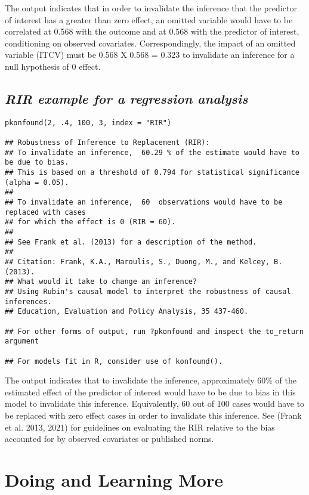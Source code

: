 \documentclass[
]{article}
\begin{document}
The output indicates that in order to invalidate the inference that the
predictor of interest has a greater than zero effect, an omitted
variable would have to be correlated at 0.568 with the outcome and at
0.568 with the predictor of interest, conditioning on observed
covariates. Correspondingly, the impact of an omitted variable (ITCV)
must be 0.568 X 0.568 = 0.323 to invalidate an inference for a null
hypothesis of 0 effect.

\hypertarget{rir-example-for-a-regression-analysis}{%
\subsection{\texorpdfstring{\emph{RIR example for a regression
analysis}}{RIR example for a regression analysis}}\label{rir-example-for-a-regression-analysis}}

\begin{verbatim}
pkonfound(2, .4, 100, 3, index = "RIR")

## Robustness of Inference to Replacement (RIR):
## To invalidate an inference,  60.29 % of the estimate would have to be due to bias. 
## This is based on a threshold of 0.794 for statistical significance (alpha = 0.05).
## 
## To invalidate an inference,  60  observations would have to be replaced with cases
## for which the effect is 0 (RIR = 60).
## 
## See Frank et al. (2013) for a description of the method.
## 
## Citation: Frank, K.A., Maroulis, S., Duong, M., and Kelcey, B. (2013).
## What would it take to change an inference?
## Using Rubin's causal model to interpret the robustness of causal inferences.
## Education, Evaluation and Policy Analysis, 35 437-460.

## For other forms of output, run ?pkonfound and inspect the to_return argument

## For models fit in R, consider use of konfound().
\end{verbatim}

The output indicates that to invalidate the inference, approximately
60\% of the estimated effect of the predictor of interest would have to
be due to bias in this model to invalidate this inference. Equivalently,
60 out of 100 cases would have to be replaced with zero effect cases in
order to invalidate this inference. See (Frank et al. 2013, 2021) for
guidelines on evaluating the RIR relative to the bias accounted for by
observed covariates or published norms.

\hypertarget{doing-and-learning-more}{%
\section{Doing and Learning More}\label{doing-and-learning-more}}
\end{document}
